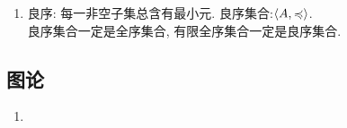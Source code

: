 \begin{enumerate}
\item 良序: 每一非空子集总含有最小元. 良序集合:$\langle A,\preccurlyeq\rangle$.\\
良序集合一定是全序集合, 有限全序集合一定是良序集合.

\end{enumerate}


\subsection{图论}

\begin{enumerate}

\item 

\end{enumerate}

